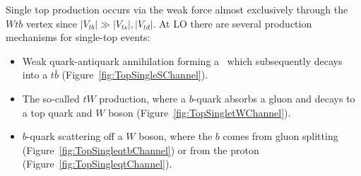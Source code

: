 Single top production occurs via the weak force almost exclusively through the $Wtb$ vertex since $|V_{tb}|\gg|V_{ts}|,|V_{td}|$. At LO there are several production mechanisms for single-top events:

\begin{itemize}
  \item Weak quark-antiquark annihilation forming a \W\ which subsequently decays into a $t\bar{b}$ (Figure~\ref{fig:TopSingleSChannel}).
  \item The so-called $tW$ production, where a $b$-quark absorbs a gluon and decays to a top quark and $W$ boson (Figure~\ref{fig:TopSingletWChannel}).
  \item $b$-quark scattering off a $W$ boson, where the $b$ comes from gluon splitting (Figure~\ref{fig:TopSingleqtbChannel}) or from the proton (Figure~\ref{fig:TopSingleqtChannel}).
\end{itemize}

